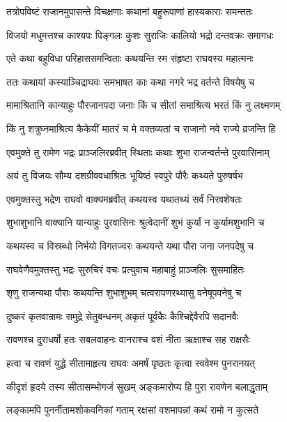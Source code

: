 \twolineshloka
{तत्रोपविष्टं राजानमुपासन्ते विचक्षणाः}
{कथानां बहुरूपाणां हास्यकाराः समन्ततः} %

\twolineshloka
{विजयो मधुमत्तश्च काश्यपः पिङ्गलः कुशः}
{सुराजिः कालियो भद्रो दन्तवक्रः समागधः} %

\twolineshloka
{एते कथा बहुविधा परिहाससमन्विताः}
{कथयन्ति स्म संहृष्टा राघवस्य महात्मनः} %

\twolineshloka
{ततः कथायां कस्याञ्चिद्राघवः समभाषत}
{काः कथा नगरे भद्र वर्तन्ते विषयेषु च} %

\twolineshloka
{मामाश्रितानि कान्याहुः पौरजानपदा जनाः}
{किं च सीतां समाश्रित्य भरतं किं नु लक्ष्मणम्} %

\twolineshloka
{किं नु शत्रुघ्नमाश्रित्य कैकेयीं मातरं च मे}
{वक्तव्यतां च राजानो नवे राज्ये व्रजन्ति हि} %

\twolineshloka
{एवमुक्ते तु रामेण भद्रः प्राञ्जलिरब्रवीत्}
{स्थिताः कथाः शुभा राजन्वर्तन्ते पुरवासिनाम्} %

\twolineshloka
{अयं तु विजयः सौम्य दशग्रीववधाश्रितः}
{भूयिष्ठं स्वपुरे पौरैः कथ्यते पुरुषर्षभ} %

\twolineshloka
{एवमुक्तस्तु भद्रेण राघवो वाक्यमब्रवीत्}
{कथयस्व यथातथ्यं सर्वं निरवशेषतः} %

\twolineshloka
{शुभाशुभानि वाक्यानि यान्याहुः पुरवासिनः}
{श्रुत्वेदानीं शुभं कुर्यां न कुर्यामशुभानि च} %

\twolineshloka
{कथयस्व च विस्रब्धो निर्भयो विगतज्वरः}
{कथयन्ते यथा पौरा जना जनपदेषु च} %

\twolineshloka
{राघवेणैवमुक्तस्तु भद्रः सुरुचिरं वचः}
{प्रत्युवाच महाबाहुं प्राञ्जलिः सुसमाहितः} %

\twolineshloka
{शृणु राजन्यथा पौराः कथयन्ति शुभाशुभम्}
{चत्वरापणरथ्यासु वनेषूपवनेषु च} %

\twolineshloka
{दुष्करं कृतवान्रामः समुद्रे सेतुबन्धनम्}
{अकृतं पूर्वकैः कैश्चिद्देवैरपि सदानवैः} %

\twolineshloka
{रावणश्च दुराधर्षो हतः सबलवाहनः}
{वानराश्च वशं नीता ऋक्षाश्च सह राक्षसैः} %

\twolineshloka
{हत्वा च रावणं युद्धे सीतामाहृत्य राघवः}
{अमर्षं पृष्ठतः कृत्वा स्ववेश्म पुनरानयत्} %

\twolineshloka
{कीदृशं हृदये तस्य सीतासम्भोगजं सुखम्}
{अङ्कमारोप्य हि पुरा रावणेन बलाद्धृताम्} %

\twolineshloka
{लङ्कामपि पुनर्नीतामशोकवनिकां गताम्}
{रक्षसां वशमापन्नां कथं रामो न कुत्सते} %

